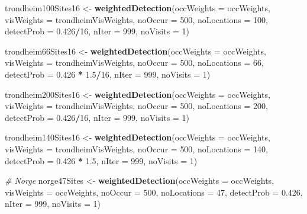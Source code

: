 \documentclass[]{article}
\newenvironment{Shaded}{\begin{snugshade}}{\end{snugshade}}
\newcommand{\KeywordTok}[1]{\textcolor[rgb]{0.13,0.29,0.53}{\textbf{#1}}}
\newcommand{\DataTypeTok}[1]{\textcolor[rgb]{0.13,0.29,0.53}{#1}}
\newcommand{\DecValTok}[1]{\textcolor[rgb]{0.00,0.00,0.81}{#1}}
\newcommand{\FloatTok}[1]{\textcolor[rgb]{0.00,0.00,0.81}{#1}}
\newcommand{\StringTok}[1]{\textcolor[rgb]{0.31,0.60,0.02}{#1}}
\newcommand{\CommentTok}[1]{\textcolor[rgb]{0.56,0.35,0.01}{\textit{#1}}}
\newcommand{\OperatorTok}[1]{\textcolor[rgb]{0.81,0.36,0.00}{\textbf{#1}}}
\newcommand{\NormalTok}[1]{#1}
\begin{document}
\begin{Shaded}
\begin{Highlighting}[]
\NormalTok{trondheim100Sites16 <-}\StringTok{ }\KeywordTok{weightedDetection}\NormalTok{(}\DataTypeTok{occWeights =}\NormalTok{ occWeights, }\DataTypeTok{visWeights =}\NormalTok{ trondheimVisWeights, }
    \DataTypeTok{noOccur =} \DecValTok{500}\NormalTok{, }\DataTypeTok{noLocations =} \DecValTok{100}\NormalTok{, }\DataTypeTok{detectProb =} \FloatTok{0.426}\OperatorTok{/}\DecValTok{16}\NormalTok{, }\DataTypeTok{nIter =} \DecValTok{999}\NormalTok{, }\DataTypeTok{noVisits =} \DecValTok{1}\NormalTok{)}


\NormalTok{trondheim66Sites16 <-}\StringTok{ }\KeywordTok{weightedDetection}\NormalTok{(}\DataTypeTok{occWeights =}\NormalTok{ occWeights, }\DataTypeTok{visWeights =}\NormalTok{ trondheimVisWeights, }
    \DataTypeTok{noOccur =} \DecValTok{500}\NormalTok{, }\DataTypeTok{noLocations =} \DecValTok{66}\NormalTok{, }\DataTypeTok{detectProb =} \FloatTok{0.426} \OperatorTok{*}\StringTok{ }\FloatTok{1.5}\OperatorTok{/}\DecValTok{16}\NormalTok{, }\DataTypeTok{nIter =} \DecValTok{999}\NormalTok{, }
    \DataTypeTok{noVisits =} \DecValTok{1}\NormalTok{)}

\NormalTok{trondheim200Sites16 <-}\StringTok{ }\KeywordTok{weightedDetection}\NormalTok{(}\DataTypeTok{occWeights =}\NormalTok{ occWeights, }\DataTypeTok{visWeights =}\NormalTok{ trondheimVisWeights, }
    \DataTypeTok{noOccur =} \DecValTok{500}\NormalTok{, }\DataTypeTok{noLocations =} \DecValTok{200}\NormalTok{, }\DataTypeTok{detectProb =} \FloatTok{0.426}\OperatorTok{/}\DecValTok{16}\NormalTok{, }\DataTypeTok{nIter =} \DecValTok{999}\NormalTok{, }\DataTypeTok{noVisits =} \DecValTok{1}\NormalTok{)}

\NormalTok{trondheim140Sites16 <-}\StringTok{ }\KeywordTok{weightedDetection}\NormalTok{(}\DataTypeTok{occWeights =}\NormalTok{ occWeights, }\DataTypeTok{visWeights =}\NormalTok{ trondheimVisWeights, }
    \DataTypeTok{noOccur =} \DecValTok{500}\NormalTok{, }\DataTypeTok{noLocations =} \DecValTok{140}\NormalTok{, }\DataTypeTok{detectProb =} \FloatTok{0.426} \OperatorTok{*}\StringTok{ }\FloatTok{1.5}\NormalTok{, }\DataTypeTok{nIter =} \DecValTok{999}\NormalTok{, }
    \DataTypeTok{noVisits =} \DecValTok{1}\NormalTok{)}



\CommentTok{# Norge}
\NormalTok{norge47Sites <-}\StringTok{ }\KeywordTok{weightedDetection}\NormalTok{(}\DataTypeTok{occWeights =}\NormalTok{ occWeights, }\DataTypeTok{visWeights =}\NormalTok{ occWeights, }
    \DataTypeTok{noOccur =} \DecValTok{500}\NormalTok{, }\DataTypeTok{noLocations =} \DecValTok{47}\NormalTok{, }\DataTypeTok{detectProb =} \FloatTok{0.426}\NormalTok{, }\DataTypeTok{nIter =} \DecValTok{999}\NormalTok{, }\DataTypeTok{noVisits =} \DecValTok{1}\NormalTok{)}


\end{Highlighting}
\end{Shaded}
\end{document}
